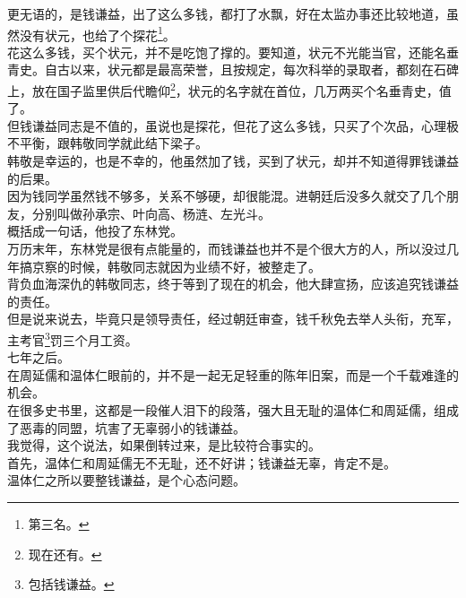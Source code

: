 \begin{multicols}{\theparacolNo}
更无语的，是钱谦益，出了这么多钱，都打了水飘，好在太监办事还比较地道，虽然没有状元，也给了个探花\footnote{第三名。}。\\

花这么多钱，买个状元，并不是吃饱了撑的。要知道，状元不光能当官，还能名垂青史。自古以来，状元都是最高荣誉，且按规定，每次科举的录取者，都刻在石碑上，放在国子监里供后代瞻仰\footnote{现在还有。}，状元的名字就在首位，几万两买个名垂青史，值了。\\

但钱谦益同志是不值的，虽说也是探花，但花了这么多钱，只买了个次品，心理极不平衡，跟韩敬同学就此结下梁子。\\

韩敬是幸运的，也是不幸的，他虽然加了钱，买到了状元，却并不知道得罪钱谦益的后果。\\

因为钱同学虽然钱不够多，关系不够硬，却很能混。进朝廷后没多久就交了几个朋友，分别叫做孙承宗、叶向高、杨涟、左光斗。\\

概括成一句话，他投了东林党。\\

万历末年，东林党是很有点能量的，而钱谦益也并不是个很大方的人，所以没过几年搞京察的时候，韩敬同志就因为业绩不好，被整走了。\\

背负血海深仇的韩敬同志，终于等到了现在的机会，他大肆宣扬，应该追究钱谦益的责任。\\

但是说来说去，毕竟只是领导责任，经过朝廷审查，钱千秋免去举人头衔，充军，主考官\footnote{包括钱谦益。}罚三个月工资。\\

七年之后。\\

在周延儒和温体仁眼前的，并不是一起无足轻重的陈年旧案，而是一个千载难逢的机会。\\

在很多史书里，这都是一段催人泪下的段落，强大且无耻的温体仁和周延儒，组成了恶毒的同盟，坑害了无辜弱小的钱谦益。\\

我觉得，这个说法，如果倒转过来，是比较符合事实的。\\

首先，温体仁和周延儒无不无耻，还不好讲；钱谦益无辜，肯定不是。\\

温体仁之所以要整钱谦益，是个心态问题。\\


\end{multicols}
